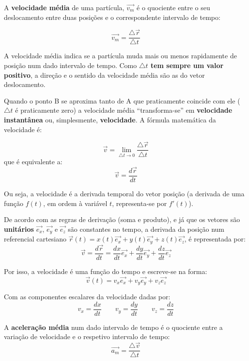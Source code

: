 \documentclass[a4paper,11pt,oneside]{report}
\begin{document}
A \textbf{velocidade média} de uma partícula, $\overrightarrow{v_m}$  é o quociente entre o seu deslocamento entre duas posições e o correspondente 
intervalo de tempo:

\[
    \overrightarrow{v_m}=\frac{\bigtriangleup\overrightarrow{r}}{\bigtriangleup t}  
\]

A velocidade média indica se a partícula muda mais ou menos rapidamente de posição num dado intervalo de tempo. Como \textbf{$\bigtriangleup t$
tem sempre um valor positivo}, a direção e o sentido da velocidade média são as do vetor deslocamento.

Quando o ponto B se aproxima tanto de A que praticamente coincide com ele ($\bigtriangleup t$ é praticamente zero) 
a velocidade média “transforma-se” em \textbf{velocidade instantânea} ou, simplesmente, \textbf{velocidade}. A fórmula matemática da velocidade é:

\[
    \overrightarrow{v}=\lim_{\bigtriangleup t \to 0}   \frac{\bigtriangleup\overrightarrow{r}}{\bigtriangleup t} 
\]
que é equivalente a:
\[
    \overrightarrow{v}=\frac{d \overrightarrow{r}}{d t}  
\]

Ou seja, a velocidade é a derivada temporal do vetor posição (a derivada de uma função $f(t)$, em ordem à variável $t$, 
representa-se por $f'(t)$).

De acordo com as regras de derivação (soma e produto), e já que os vetores são \textbf{unitários} $\overrightarrow{e_x}$, $\overrightarrow{e_y}$ e $\overrightarrow{e_z}$ são constantes no tempo, 
a derivada da posição num referencial cartesiano $\overrightarrow{r}(t)=x(t)\overrightarrow{e_x}+y(t)\overrightarrow{e_y}+z(t)\overrightarrow{e_z}$, é representada por:
\[
   \overrightarrow{v}=\frac{d \overrightarrow{r}}{d t}=\frac{d x}{d t} \overrightarrow{e_x}+\frac{d y}{d t} \overrightarrow{e_y}+\frac{d z}{d t} \overrightarrow{e_z}
\]        

Por isso, a velocidade é uma função do tempo e escreve-se na forma:
\[
    \overrightarrow{v}(t)=v_x \overrightarrow{e_x}+v_y \overrightarrow{e_y}+v_z \overrightarrow{e_z}   
\] 

Com as componentes escalares da velocidade dadas por:
\[
    v_x=\frac{d x}{d t} \qquad v_y=\frac{d y}{d t} \qquad v_z=\frac{d z}{d t} 
\]

A \textbf{aceleração média} num dado intervalo de tempo é o quociente entre a variação de velocidade e o respetivo intervalo de tempo:
\[
    \overrightarrow{a_m}=\frac{\bigtriangleup\overrightarrow{v}}{\bigtriangleup t}  
\]
\end{document}
